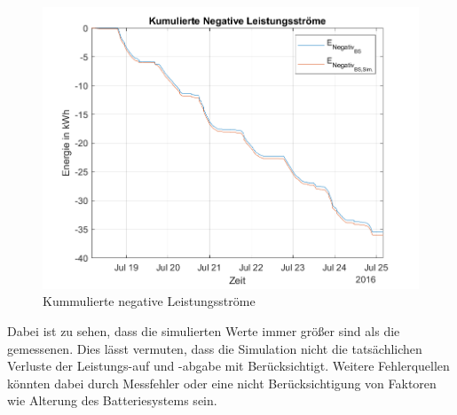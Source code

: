 \begin{figure}[H]
    \centering
    \includegraphics[width=\textwidth]{Abbildungen/plot6.png}
    \caption{Kummulierte negative Leistungsströme}
    \label{fig:plot1_230730_3}
\end{figure}
Dabei ist zu sehen, dass die simulierten Werte immer größer sind als die gemessenen. Dies lässt vermuten, dass die Simulation 
nicht die tatsächlichen Verluste der Leistungs-auf und -abgabe mit Berücksichtigt. Weitere Fehlerquellen könnten dabei durch Messfehler oder eine nicht Berücksichtigung von Faktoren wie Alterung des Batteriesystems sein.\\

